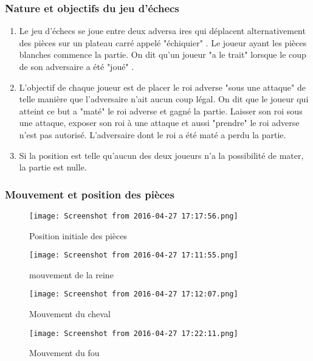 

\subsubsection{Nature et objectifs du jeu d’échecs}

\begin{enumerate}

\item Le jeu d’échecs se joue entre deux adversa
ires  qui  déplacent  alternativement  des  pièces  sur  un  plateau 
carré appelé 
"échiquier"
. Le joueur ayant les pièces blanches commence la partie. On dit qu’un joueur 
"a le trait"
lorsque le coup de son adversaire a été 
"joué"
.
\item L’objectif  de
chaque  joueur  est  de  placer  le  roi  adverse 
"sous  une  attaque"
de  telle  manière  que 
l’adversaire n’ait aucun coup légal. On dit que le joueur qui atteint ce but a 
"maté"
le roi adverse et 
gagné la partie. Laisser son roi sous une attaque, exposer son roi à
une attaque et aussi 
"prendre"
le 
roi adverse n'est pas autorisé. L’adversaire dont le roi a été maté a perdu la partie.

\item Si la position est telle qu’aucun des deux joueurs n’a la possibilité de mater, la partie est nulle. \\

\end{enumerate}

\subsubsection{Mouvement et position des pièces}

\begin{figure}
  \texttt{[image: Screenshot from 2016-04-27 17:17:56.png]}
  \caption{Position initiale des pièces}
\end{figure}

\begin{figure}
  \texttt{[image: Screenshot from 2016-04-27 17:11:55.png]}
  \caption{mouvement de la reine}
  \end{figure}

\begin{figure}
  \texttt{[image: Screenshot from 2016-04-27 17:12:07.png]}
  \caption{Mouvement du cheval}
  \end{figure}

\begin{figure}
  \texttt{[image: Screenshot from 2016-04-27 17:22:11.png]}
  \caption{Mouvement du fou}
  \end{figure}


